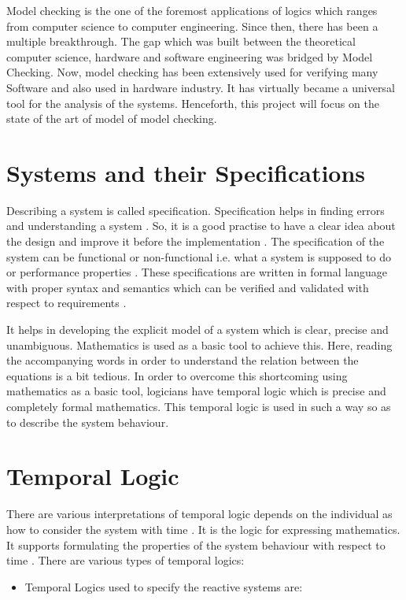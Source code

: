\documentclass[a4paper,12pt]{report}
\begin{document}
\begin{onehalfspacing}
Model checking is the one of the foremost applications of logics which ranges from computer science to computer engineering. Since then, there has been a multiple breakthrough. The gap which was built between the theoretical computer science, hardware and software engineering was bridged by Model Checking. Now, model checking has been extensively used for verifying many Software and also used in hardware industry\cite{Jackson2000}. It has virtually became a universal tool for the analysis of the systems. Henceforth, this project will focus on the state of the art of model of model checking.

\section{Systems and their Specifications}
\label{Sys and Spec}

Describing a system is called specification. Specification helps in finding errors and understanding a system \cite{Wang2007}. So, it is a good practise to have a clear idea about the design and improve it before the implementation \cite{ErichGamma1995}. The specification of the system can be functional or non-functional i.e. what a system is supposed to do or performance properties \cite{Wang2007}. These specifications are written in formal language with proper syntax and semantics which can be verified and validated with respect to requirements \cite{J.M.Wing1996}.

It helps in developing the explicit model of a system which is clear, precise and unambiguous. Mathematics is used as a basic tool to achieve this. Here, reading the accompanying words in order to understand the relation between the equations is a bit tedious. In order to overcome this shortcoming using mathematics as a basic tool, logicians have temporal logic which is precise and completely formal mathematics. This temporal logic is used in such a way so as to describe the system behaviour. 

\section{Temporal Logic} 
\label{Temp Logic}

There are various interpretations of temporal logic depends on the individual as how to consider the system with time \cite{B.Berard2001}. It is the logic for expressing mathematics. It supports formulating the properties of the system behaviour with respect to time \cite{B.Berard2001}. There are various types of temporal logics:
\begin{itemize}
\item Temporal Logics used to specify the reactive systems are:


\end{itemize}
\end{onehalfspacing}
\end{document}
